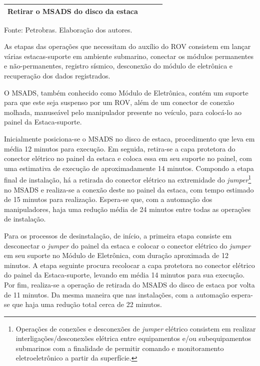 \begin{table}[h]
{\begin{threeparttable}
\begin{tabular}{l >{\centering\arraybackslash}m{3.0cm} >{\centering\arraybackslash}m{3.0cm} >{\centering\arraybackslash}m{3.0cm}}
			\hspace{3mm}Retirar o MSADS do disco da estaca                                 & 11                                          & 4        \\ \hline
		\end{tabular}
		\begin{tablenotes}
			\item Fonte: Petrobras. Elaboração dos autores.
		\end{tablenotes}
	\end{threeparttable}
	}
\end{table}

As etapas das operações que necessitam do auxílio do ROV consistem em lançar várias estacas-suporte em ambiente submarino, conectar os módulos permanentes e não-permanentes, registro sísmico, desconexão do módulo de eletrônica e recuperação dos dados registrados.  

O MSADS, também conhecido como Módulo de Eletrônica, contém um suporte para que este seja suspenso por um ROV, além de um conector de conexão molhada, manuseável pelo manipulador presente no veículo, para colocá-lo ao painel da Estaca-suporte. 

Inicialmente posiciona-se o MSADS no disco de estaca, procedimento que leva em média 12 minutos para execução. Em seguida, retira-se a capa protetora do conector elétrico no painel da estaca e coloca essa em seu suporte no painel, com uma estimativa de execução de aproximadamente 14 minutos. Compondo a etapa final de instalação, há a retirada do conector elétrico na extremidade do \textit{jumper}\footnote{Operações de conexões e desconexões de \textit{jumper} elétrico consistem em realizar interligações/desconexões elétrica entre equipamentos e/ou subequipamentos submarinos com a finalidade de permitir comando e monitoramento eletroeletrônico a partir da superfície.}  no MSADS e realiza-se a conexão deste no painel da estaca, com tempo estimado de 15 minutos para realização. Espera-se que, com a automação dos manipuladores, haja uma redução média de 24 minutos entre todas as operações de instalação.

Para os processos de desinstalação, de início, a primeira etapa consiste em desconectar o \textit{jumper} do painel da estaca e colocar o conector elétrico do \textit{jumper} em seu suporte no Módulo de Eletrônica, com duração aproximada de 12 minutos. A etapa seguinte procura recolocar a capa protetora no conector elétrico do painel da Estaca-suporte, levando em média 14 minutos para sua execução. Por fim, realiza-se a operação de retirada do MSADS do disco de estaca por volta de 11 minutos. Da mesma maneira que nas instalações, com a automação espera-se que haja uma redução total cerca de 22 minutos.

